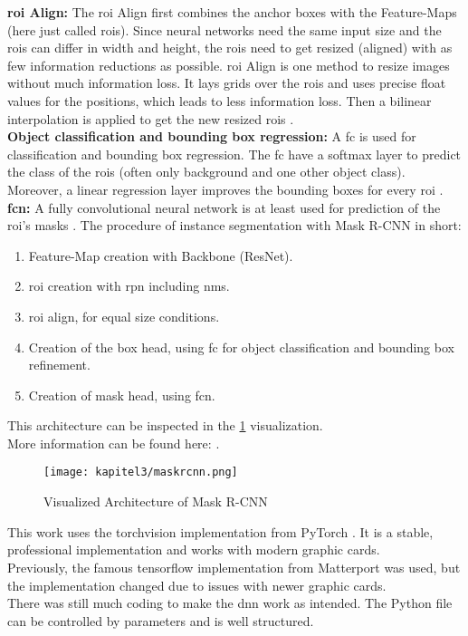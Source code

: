 		\textbf{\ac{roi} Align:} The \ac{roi} Align first combines the anchor boxes with the Feature-Maps (here just called \ac{roi}s). Since neural networks need the same input size and the \ac{roi}s can differ in width and height, the \ac{roi}s need to get resized (aligned) with as few information reductions as possible. \ac{roi} Align is one method to resize images without much information loss. It lays grids over the \ac{roi}s and uses precise float values for the positions, which leads to less information loss. Then a bilinear interpolation is applied to get the new resized \ac{roi}s \cite{Kaiming2017}.\\
		\textbf{Object classification and bounding box regression:} A \ac{fc} is used for classification and bounding box regression. The \ac{fc} have a softmax layer to predict the class of the \ac{roi}s (often only background and one other object class). Moreover, a linear regression layer improves the bounding boxes for every \ac{roi} \cite{Ren2016}.
		\textbf{\ac{fcn}:} A fully convolutional neural network is at least used for prediction of the \ac{roi}'s masks \cite{Kang2014}.
		\newpage
		The procedure of instance segmentation with Mask R-CNN in short:
		\begin{enumerate}
			\item Feature-Map creation with Backbone (ResNet).
			\item \ac{roi} creation with \ac{rpn} including \ac{nms}.
			\item \ac{roi} align, for equal size conditions.
			\item Creation of the box head, using \ac{fc} for object classification and bounding box refinement.
			\item Creation of mask head, using \ac{fcn}.
		\end{enumerate}
		This architecture can be inspected in the \ref{img:maskrcnn} visualization.\\
		More information can be found here: \cite{Kaiming2017}\cite{Ramesh2021}. 
		
		\begin{figure}[h]
			\centering
			\texttt{[image: kapitel3/maskrcnn.png]}
			\caption[Visualized Architecture of Mask R-CNN by Tobia Ippolito]{Visualized Architecture of Mask R-CNN}
			\label{img:maskrcnn}
		\end{figure}
		
		This work uses the torchvision implementation from PyTorch \cite{Torchvision}. It is a stable, professional implementation and works with modern graphic cards.\\
		Previously, the famous tensorflow implementation from Matterport \cite{Matterport} was used, but the implementation changed due to issues with newer graphic cards.\\
		There was still much coding to make the \ac{dnn} work as intended. The Python file can be controlled by parameters and is well structured.\\
		
